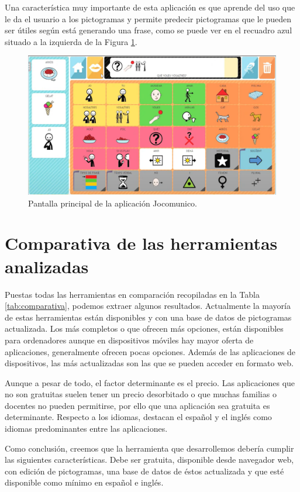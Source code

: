 Una característica muy importante de esta aplicación es que aprende del uso que le da el usuario a los pictogramas y permite predecir pictogramas que le pueden ser útiles según está generando una frase, como se puede ver en el recuadro azul situado a la izquierda de la Figura \ref{fig:jocomunico}.

\begin{figure}[h!]
	\centering
	\includegraphics[width=0.7\linewidth]{Imagenes/Bitmap/jocomunico}
	\caption{Pantalla principal de la aplicación Jocomunico.}
	\label{fig:jocomunico}
\end{figure}


\section*{Comparativa de las herramientas analizadas}


Puestas todas las herramientas en comparación recopiladas en la Tabla \ref{tab:comparativa}, podemos extraer algunos resultados. Actualmente la mayoría de estas herramientas están disponibles y con una base de datos de pictogramas actualizada. Los más completos o que ofrecen más opciones, están disponibles para ordenadores aunque en dispositivos móviles hay mayor oferta  de aplicaciones, generalmente ofrecen pocas opciones. Además de las aplicaciones de dispositivos, las más actualizadas son las que se pueden acceder en formato web.

Aunque a pesar de todo, el factor determinante es el precio. Las aplicaciones que no son gratuitas suelen tener un precio desorbitado o que muchas familias o docentes no pueden permitirse, por ello que una aplicación sea gratuita es determinante. Respecto a los idiomas, destacan el español y el inglés como idiomas predominantes entre las aplicaciones. 

Como conclusión, creemos que la herramienta que desarrollemos debería cumplir las siguientes características. Debe ser gratuita, disponible desde navegador web, con edición de pictogramas, una base de datos de éstos actualizada y que esté disponible como mínimo en español e inglés. 

